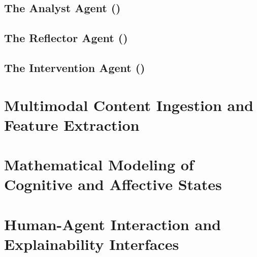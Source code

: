 \subsection{The Analyst Agent (\agentAnalyst)}

\subsection{The Reflector Agent (\agentReflector)}

\subsection{The Intervention Agent (\agentInterventionist)}

\section{Multimodal Content Ingestion and Feature Extraction}
\label{sec:arch_ingestion_pipeline}

\section{Mathematical Modeling of Cognitive and Affective States}
\label{sec:arch_math_model}

\section{Human-Agent Interaction and Explainability Interfaces}
\label{sec:arch_hai}
